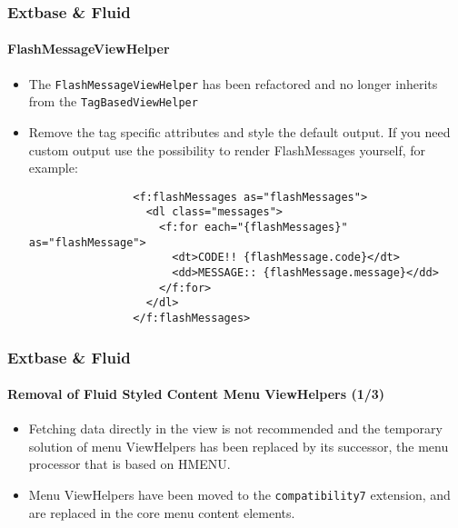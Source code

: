 
\begin{frame}[fragile]
	\frametitle{Extbase \& Fluid}
	\framesubtitle{FlashMessageViewHelper}

	\lstset{basicstyle=\tiny\ttfamily}

	\begin{itemize}
		\item The \texttt{FlashMessageViewHelper} has been refactored and no longer inherits
			from the \texttt{TagBasedViewHelper}

		\item Remove the tag specific attributes and style the default output.
			If you need custom output use the possibility to render FlashMessages yourself, for example:

			\begin{lstlisting}
				<f:flashMessages as="flashMessages">
				  <dl class="messages">
				    <f:for each="{flashMessages}" as="flashMessage">
				      <dt>CODE!! {flashMessage.code}</dt>
				      <dd>MESSAGE:: {flashMessage.message}</dd>
				    </f:for>
				  </dl>
				</f:flashMessages>
			\end{lstlisting}

	\end{itemize}

\end{frame}


\begin{frame}[fragile]
	\frametitle{Extbase \& Fluid}
	\framesubtitle{Removal of Fluid Styled Content Menu ViewHelpers (1/3)}

	\begin{itemize}
		\item Fetching data directly in the view is not recommended and
			the temporary solution of menu ViewHelpers has been replaced by
			its successor, the menu processor that is based on HMENU.

		\item Menu ViewHelpers have been moved to the \texttt{compatibility7}
			extension, and are replaced in the core menu content elements.

	\end{itemize}

\end{frame}

